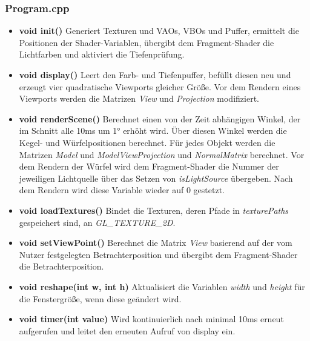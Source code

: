 \documentclass{scrartcl}
\begin{document}
            \subsubsection*{Program.cpp}
                \begin{itemize}
                \item \textbf{void init()}
                    Generiert Texturen und VAOs, VBOs und Puffer, ermittelt die Positionen 
                    der Shader-Variablen, übergibt dem Fragment-Shader die Lichtfarben und 
                    aktiviert die Tiefenprüfung.
                \item \textbf{void display()}
                    Leert den Farb- und Tiefenpuffer, befüllt diesen neu und erzeugt vier 
                    quadratische Viewports gleicher Größe. Vor dem Rendern eines Viewports 
                    werden die Matrizen \textit{View} und \textit{Projection} modifiziert.
                \item \textbf{void renderScene()}
                    Berechnet einen von der Zeit abhängigen Winkel, der im Schnitt alle 10ms 
                    um \ang{1} erhöht wird. Über diesen Winkel werden die Kegel- und Würfelpositionen
                    berechnet. Für jedes Objekt werden die Matrizen \textit{Model} und
                    \textit{ModelViewProjection} und \textit{NormalMatrix} berechnet. 
                    Vor dem Rendern der Würfel wird dem Fragment-Shader die Nummer der 
                    jeweiligen Lichtquelle über das Setzen von \textit{isLightSource} übergeben. 
                    Nach dem Rendern wird diese Variable wieder auf 0 gestetzt. 
                \item \textbf{void loadTextures()}
                    Bindet die Texturen, deren Pfade in \textit{texturePaths} gespeichert sind, an 
                    \textit{GL\_TEXTURE\_2D}.
                \item \textbf{void setViewPoint()}
                    Berechnet die Matrix \textit{View} basierend auf der vom Nutzer festgelegten 
                    Betrachterposition und übergibt dem Fragment-Shader die Betrachterposition.
                \item \textbf{void reshape(int w, int h)}
                    Aktualisiert die Variablen \textit{width} und \textit{height} für die Fenstergröße, 
                    wenn diese geändert wird.
                \item \textbf{void timer(int value)}
                    Wird kontinuierlich nach minimal 10ms erneut aufgerufen und leitet den erneuten Aufruf von display ein.

\end{itemize}
\end{document}
